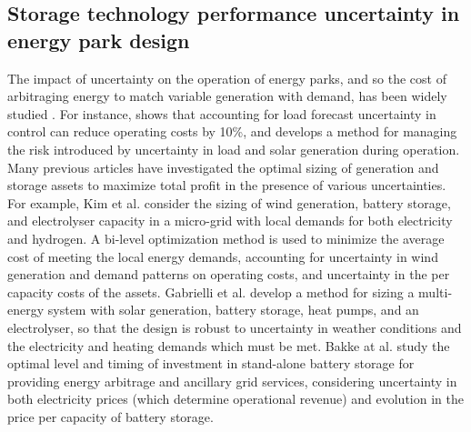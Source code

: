 \subsection{Storage technology performance uncertainty in energy park design}

The impact of uncertainty on the operation of energy parks, and so the cost of arbitraging energy to match variable generation with demand, has been widely studied \citep{kim2017RobustOperationEnergy,ji2025OptimalSchedulingParklevel,zhang2023OptimalEconomicProgramming,li2021OptimalOperationModel}. %
For instance, \citep{kim2017RobustOperationEnergy} shows that accounting for load forecast uncertainty in control can reduce operating costs by 10\%, and \citep{ji2025OptimalSchedulingParklevel} develops a method for managing the risk introduced by uncertainty in load and solar generation during operation.
Many previous articles have investigated the optimal sizing of generation and storage assets to maximize total profit in the presence of various uncertainties.
For example, Kim et al. \citep{kim2024MultiperiodMultitimescaleStochastic} consider the sizing of wind generation, battery storage, and electrolyser capacity in a micro-grid with local demands for both electricity and hydrogen. A bi-level optimization method is used to minimize the average cost of meeting the local energy demands, accounting for uncertainty in wind generation and demand patterns on operating costs, and uncertainty in the per capacity costs of the assets.
Gabrielli et al. \citep{gabrielli2019RobustOptimalDesign} develop a method for sizing a multi-energy system with solar generation, battery storage, heat pumps, and an electrolyser, so that the design is robust to uncertainty in weather conditions and the electricity and heating demands which must be met.
Bakke at al. \citep{bakke2016InvestmentElectricEnergy} study the optimal level and timing of investment in stand-alone battery storage for providing energy arbitrage and ancillary grid services, considering uncertainty in both electricity prices (which determine operational revenue) and evolution in the price per capacity of battery storage.


